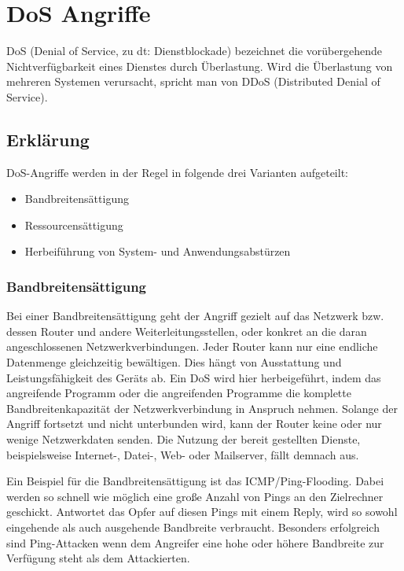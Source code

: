 \chapter{DoS Angriffe}
\label{chapter_dos_angriffe}
DoS (Denial of Service, zu dt: Dienstblockade) bezeichnet die vorübergehende Nichtverfügbarkeit eines Dienstes durch Überlastung. Wird die Überlastung von mehreren Systemen verursacht, spricht man von DDoS (Distributed Denial of Service).
\section{Erklärung}

DoS-Angriffe werden in der Regel in folgende drei Varianten aufgeteilt:

\begin{itemize}
	\item Bandbreitensättigung
	\item Ressourcensättigung
	\item Herbeiführung von System- und Anwendungsabstürzen
\end{itemize}
\subsection{Bandbreitensättigung}
Bei einer Bandbreitensättigung geht der Angriff gezielt auf das Netzwerk bzw. dessen Router und andere Weiterleitungsstellen, oder konkret an die daran angeschlossenen Netzwerkverbindungen. Jeder Router kann nur eine endliche Datenmenge gleichzeitig bewältigen. Dies hängt von Ausstattung und Leistungsfähigkeit des Geräts ab. Ein DoS wird hier herbeigeführt, indem das angreifende Programm oder die angreifenden Programme die komplette Bandbreitenkapazität der Netzwerkverbindung in Anspruch nehmen. Solange der Angriff fortsetzt und nicht unterbunden wird, kann der Router keine oder nur wenige Netzwerkdaten senden. Die Nutzung der bereit gestellten Dienste, beispielsweise Internet-, Datei-, Web- oder Mailserver, fällt demnach aus.

Ein Beispiel für die Bandbreitensättigung ist das ICMP/Ping-Flooding. Dabei werden so schnell wie möglich eine große Anzahl von Pings an den Zielrechner geschickt. Antwortet das Opfer auf diesen Pings mit einem Reply, wird so sowohl eingehende als auch ausgehende Bandbreite verbraucht.
Besonders erfolgreich sind Ping-Attacken wenn dem Angreifer eine hohe oder höhere Bandbreite zur Verfügung steht als dem Attackierten.

